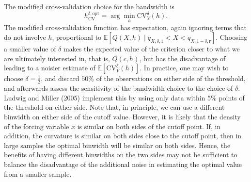 \documentclass[11pt]{book}%
\begin{document}
The modified cross-validation choice for the bandwidth is
$$
h_{\mathrm{CV}}^{\delta, \mathrm{opt}}=\arg \min _{h} \mathrm{CV}_{Y}^{\delta}(h) .
$$
The modified cross-validation function has expectation, again ignoring terms that do not involve $h$, proportional to $\mathbb{E}\left[Q(X, h) \mid q_{X, \delta, 1}<X<q_{X, 1-\delta, \mathrm{r}}\right]$. Choosing a smaller value of $\delta$ makes the expected value of the criterion closer to what we are ultimately interested in, that is, $Q(c, h)$, but has the disadvantage of leading to a noisier estimate of $\mathbb{E}\left[\mathrm{CV}_{Y}^{\delta}(h)\right]$. In practice, one may wish to choose $\delta=\frac{1}{2}$, and discard $50 \%$ of the observations on either side of the threshold, and afterwards assess the sensitivity of the bandwidth choice to the choice of $\delta$. Ludwig and Miller (2005) implement this by using only data within $5 \%$ points of the threshold on either side. Note that, in principle, we can use a different binwidth on either side of the cutoff value. However, it is likely that the density of the forcing variable $x$ is similar on both sides of the cutoff point. If, in addition, the curvature is similar on both sides close to the cutoff point, then in large samples the optimal binwidth will be similar on both sides. Hence, the benefits of having different binwidths on the two sides may not be sufficient to balance the disadvantage of the additional noise in estimating the optimal value from a smaller sample.
\end{document}
